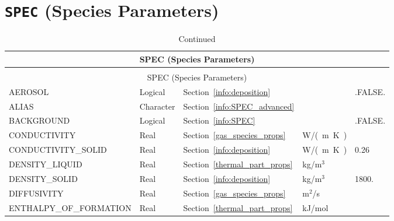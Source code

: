 \documentclass[11pt]{book}
\begin{document}

\vspace{\baselineskip}


\section{\texorpdfstring{{\tt SPEC}}{SPEC} (Species Parameters)}


\begin{longtable}{@{\extracolsep{\fill}}|l|l|l|l|l|}
\caption[Species parameters ({\ct SPEC} namelist group)]{For more information see Section~\ref{info:SPEC}.}
\label{tbl:SPEC} \\
\hline
\multicolumn{5}{|c|}{{\ct SPEC} (Species Parameters)} \\
\hline \hline
\endfirsthead
\caption[]{Continued} \\
\hline
\multicolumn{5}{|c|}{{\ct SPEC} (Species Parameters)} \\
\hline \hline
\endhead
{\ct AEROSOL}                       & Logical     & Section~\ref{info:deposition}           &                   & {\ct .FALSE.} \\ \hline
{\ct ALIAS}                         & Character   & Section~\ref{info:SPEC_advanced}        &                   &               \\ \hline
{\ct BACKGROUND}                    & Logical     & Section~\ref{info:SPEC}                 &                   & {\ct .FALSE.} \\ \hline
{\ct CONDUCTIVITY}                  & Real        & Section~\ref{gas_species_props}         & \si{W/(m.K)}      &               \\ \hline
{\ct CONDUCTIVITY\_SOLID}           & Real        & Section~\ref{info:deposition}           & \si{W/(m.K)}      &  0.26         \\ \hline
{\ct DENSITY\_LIQUID}               & Real        & Section~\ref{thermal_part_props}        & kg/m$^3$          &               \\ \hline
{\ct DENSITY\_SOLID}                & Real        & Section~\ref{info:deposition}           & kg/m$^3$          &  1800.        \\ \hline
{\ct DIFFUSIVITY}                   & Real        & Section~\ref{gas_species_props}         & m$^2$/s           &               \\ \hline
{\ct ENTHALPY\_OF\_FORMATION}       & Real        & Section~\ref{thermal_part_props}        & kJ/mol            &               \\ \hline

\end{longtable}
\end{document}
